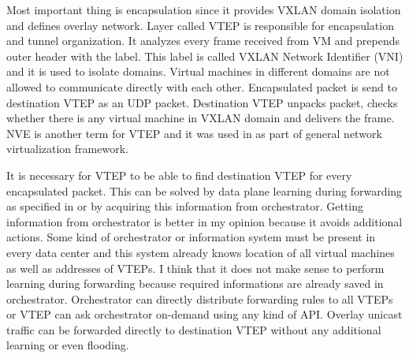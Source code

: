 Most important thing is encapsulation since it provides \Ac{VXLAN} domain isolation and defines overlay network. Layer called \Ac{VTEP} is responsible for encapsulation and tunnel organization. It analyzes every frame received from \Ac{VM} and prepends outer header with the label. This label is called \Ac{VXLAN} Network Identifier (\Ac{VNI}) and it is used to isolate domains. Virtual machines in different domains are not allowed to communicate directly with each other. Encapsulated packet is send to destination \Ac{VTEP} as an \Ac{UDP} packet. Destination \Ac{VTEP} unpacks packet, checks whether there is any virtual machine in \Ac{VXLAN} domain and delivers the frame. \Ac{NVE} is another term for \Ac{VTEP} and it was used in \cite{rfc7365} as part of general network virtualization framework.

It is necessary for \Ac{VTEP} to be able to find destination \Ac{VTEP} for every encapsulated packet. This can be solved by data plane learning during forwarding as specified in \cite{rfc7348} or by acquiring this information from orchestrator. Getting information from orchestrator is better in my opinion because it avoids additional actions. Some kind of orchestrator or information system must be present in every data center and this system already knows location of all virtual machines as well as addresses of \Ac{VTEP}s. I think that it does not make sense to perform learning during forwarding because required informations are already saved in orchestrator. Orchestrator can directly distribute forwarding rules to all \Ac{VTEP}s or \Ac{VTEP} can ask orchestrator on-demand using any kind of \Ac{API}. Overlay unicast traffic can be forwarded directly to destination \Ac{VTEP} without any additional learning or even flooding.

